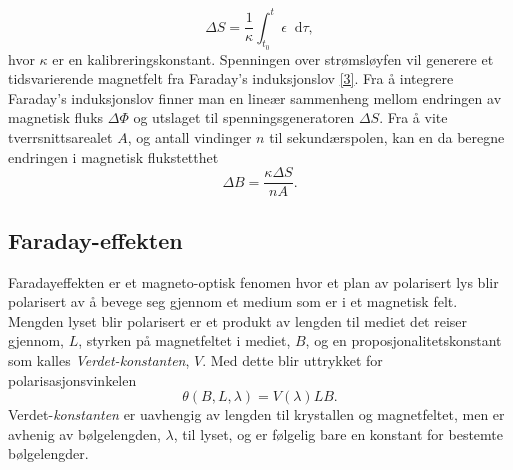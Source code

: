\documentclass[%
 reprint,
 amsmath,amssymb,
 aps,
 norsk,
]{revtex4-1}
\newcommand*\diff{\mathop{}\!\mathrm{d}}
\begin{document}
\begin{equation}
  \Delta S = \frac{1}{\kappa}\int_{t_0}^{t}\epsilon \diff \tau, \label{deltas_new}
\end{equation}
hvor $\kappa$ er en kalibreringskonstant. Spenningen over strømsløyfen vil generere et tidsvarierende magnetfelt fra Faraday's induksjonslov \eqref{3}. Fra å integrere Faraday's induksjonslov finner man en lineær sammenheng mellom endringen av magnetisk fluks $\Delta \Phi$ og utslaget til spenningsgeneratoren $\Delta S$. Fra å vite tverrsnittsarealet $A$, og antall vindinger $n$ til sekundærspolen, kan en da beregne endringen i magnetisk flukstetthet
\begin{equation}
  \Delta B = \frac{\kappa\Delta S}{nA}.\label{deltab}
\end{equation}
\subsection{Faraday-effekten}
Faradayeffekten er et magneto-optisk fenomen hvor et plan av polarisert lys blir polarisert av å bevege seg gjennom et medium som er i et magnetisk felt. Mengden lyset blir polarisert er et produkt av lengden til mediet det reiser gjennom, $L$, styrken på magnetfeltet i mediet, $B$, og en proposjonalitetskonstant som kalles \textit{Verdet-konstanten}, $V$. Med dette blir uttrykket for polarisasjonsvinkelen
\begin{equation}
  \theta\left(B, L, \lambda\right) = V\left(\lambda\right)LB.\label{verdet}
\end{equation}
Verdet-\textit{konstanten} er uavhengig av lengden til krystallen og magnetfeltet, men er avhenig av bølgelengden, $\lambda$, til lyset, og er følgelig bare en konstant for bestemte bølgelengder.\\
\end{document}
